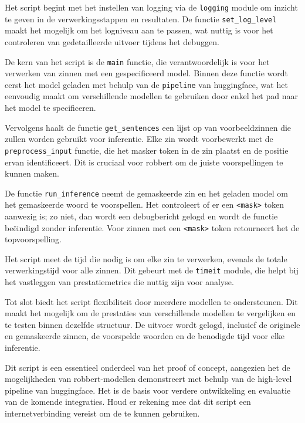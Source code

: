 Het script begint met het instellen van logging via de \texttt{logging} module om inzicht te geven in de verwerkingsstappen en resultaten. De functie \texttt{set\_log\_level} maakt het mogelijk om het logniveau aan te passen, wat nuttig is voor het controleren van gedetailleerde uitvoer tijdens het debuggen.

De kern van het script is de \texttt{main} functie, die verantwoordelijk is voor het verwerken van zinnen met een gespecificeerd model. Binnen deze functie wordt eerst het model geladen met behulp van de \texttt{pipeline}  van \gls{huggingface}, wat het eenvoudig maakt om verschillende modellen te gebruiken door enkel het pad naar het model te specificeren.

Vervolgens haalt de functie \texttt{get\_sentences} een lijst op van voorbeeldzinnen die zullen worden gebruikt voor inferentie. Elke zin wordt voorbewerkt met de \texttt{preprocess\_input} functie, die het masker token in de zin plaatst en de positie ervan identificeert. Dit is cruciaal voor \gls{robbert} om de juiste voorspellingen te kunnen maken.

De functie \texttt{run\_inference} neemt de gemaskeerde zin en het geladen model om het gemaskeerde woord te voorspellen. Het controleert of er een \texttt{<mask>} token aanwezig is; zo niet, dan wordt een debugbericht gelogd en wordt de functie beëindigd zonder inferentie. Voor zinnen met een \texttt{<mask>} token retourneert het de topvoorspelling.

Het script meet de tijd die nodig is om elke zin te verwerken, evenals de totale verwerkingstijd voor alle zinnen. Dit gebeurt met de \texttt{timeit} module, die helpt bij het vastleggen van prestatiemetrics die nuttig zijn voor analyse.

Tot slot biedt het script flexibiliteit door meerdere modellen te ondersteunen. Dit maakt het mogelijk om de prestaties van verschillende modellen te vergelijken en te testen binnen dezelfde structuur. De uitvoer wordt gelogd, inclusief de originele en gemaskeerde zinnen, de voorspelde woorden en de benodigde tijd voor elke inferentie.

Dit script is een essentieel onderdeel van het proof of concept, aangezien het de mogelijkheden van \gls{robbert}-modellen demonstreert met behulp van de high-level pipeline  van \gls{huggingface}. Het is de basis voor verdere ontwikkeling en evaluatie van de komende integraties. Houd er rekening mee dat dit script een internetverbinding vereist om de  te kunnen gebruiken.

